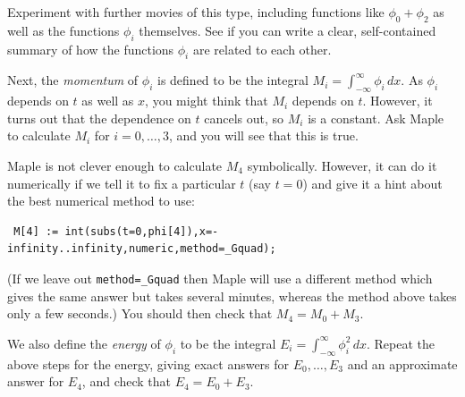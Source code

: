 \documentclass[a4paper,10pt]{amsbook}
\begin{document}
Experiment with further movies of this type, including functions like
$\phi_0+\phi_2$ as well as the functions $\phi_i$ themselves.  See if
you can write a clear, self-contained summary of how the functions
$\phi_i$ are related to each other.

Next, the \emph{momentum} of $\phi_i$ is defined to be the integral
$M_i=\int_{-\infty}^\infty \phi_i\,dx$.  As $\phi_i$ depends on $t$ as
well as $x$, you might think that $M_i$ depends on $t$.  However, it
turns out that the dependence on $t$ cancels out, so $M_i$ is a
constant.  Ask Maple to calculate $M_i$ for $i=0,\dotsc,3$, and you
will see that this is true.

Maple is not clever enough to calculate $M_4$ symbolically.  However,
it can do it numerically if we tell it to fix a particular $t$ (say
$t=0$) and give it a hint about the best numerical method to use:
\begin{verbatim}
 M[4] := int(subs(t=0,phi[4]),x=-infinity..infinity,numeric,method=_Gquad);
\end{verbatim}
(If we leave out \verb~method=_Gquad~ then Maple will use a different
method which gives the same answer but takes several minutes, whereas
the method above takes only a few seconds.)  You should then check
that $M_4=M_0+M_3$.

We also define the \emph{energy} of $\phi_i$ to be the integral
$E_i=\int_{-\infty}^\infty\phi_i^2\,dx$.  Repeat the above steps for
the energy, giving exact answers for $E_0,\dotsc,E_3$ and an
approximate answer for $E_4$, and check that $E_4=E_0+E_3$.
\end{document}
